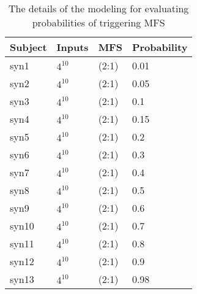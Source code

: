 \documentclass[10pt,journal,compsoc]{IEEEtran}
\begin{document}


\begin{table}[htbp]
\center
\caption{The details of the modeling for evaluating  probabilities of triggering MFS}
\label{detail-eva-pro}

\begin{tabular}{|l|l|l|l|}
\hline
Subject & Inputs & MFS  & Probability \\\hline
syn1 & $4^{10}$ &  (2:1)  & 0.01 \\ \hline
syn2 & $4^{10}$ &  (2:1)  & 0.05 \\ \hline
syn3 & $4^{10}$ &  (2:1)  & 0.1 \\ \hline
syn4 & $4^{10}$ &  (2:1)  & 0.15 \\ \hline
syn5 & $4^{10}$ &  (2:1)  & 0.2 \\ \hline
syn6 & $4^{10}$ &  (2:1)  & 0.3 \\ \hline
syn7 & $4^{10}$ &  (2:1)  & 0.4 \\ \hline
syn8 & $4^{10}$ &  (2:1)  & 0.5 \\ \hline
syn9 & $4^{10}$ &  (2:1)  & 0.6 \\ \hline
syn10 & $4^{10}$ &  (2:1)  & 0.7 \\ \hline
syn11 & $4^{10}$ &  (2:1)  & 0.8 \\ \hline
syn12 & $4^{10}$ &  (2:1)  & 0.9 \\ \hline
syn13 & $4^{10}$ &  (2:1)  & 0.98 \\ \hline
\end{tabular}

\end{table}

\end{document}
